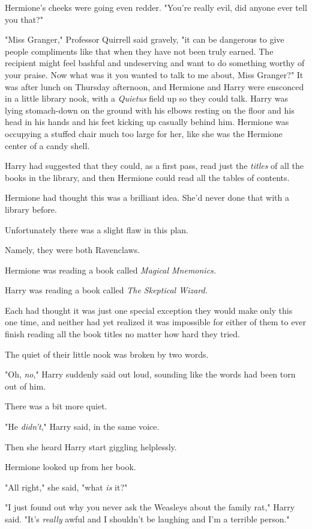 Hermione's cheeks were going even redder. "You're really evil, did anyone ever 
tell you that?"

"Miss Granger," Professor Quirrell said gravely, "it can be dangerous to give 
people compliments like that when they have not been truly earned. The 
recipient might feel bashful and undeserving and want to do something worthy of 
your praise. Now what was it you wanted to talk to me about, Miss Granger?"
\sbreak
It was after lunch on Thursday afternoon, and Hermione and Harry were ensconced 
in a little library nook, with a \emph{Quietus} field up so they could talk. 
Harry was lying stomach-down on the ground with his elbows resting on the floor 
and his head in his hands and his feet kicking up casually behind him. Hermione 
was occupying a stuffed chair much too large for her, like she was the Hermione 
center of a candy shell.

Harry had suggested that they could, as a first pass, read just the 
\emph{titles} of all the books in the library, and then Hermione could read all 
the tables of contents.

Hermione had thought this was a brilliant idea. She'd never done that with a 
library before.

Unfortunately there was a slight flaw in this plan.

Namely, they were both Ravenclaws.

Hermione was reading a book called \emph{Magical Mnemonics.}

Harry was reading a book called \emph{The Skeptical Wizard.}

Each had thought it was just one special exception they would make only this 
one time, and neither had yet realized it was impossible for either of them to 
ever finish reading all the book titles no matter how hard they tried.

The quiet of their little nook was broken by two words.

"Oh, \emph{no}," Harry suddenly said out loud, sounding like the words had been 
torn out of him.

There was a bit more quiet.

"He \emph{didn't}," Harry said, in the same voice.

Then she heard Harry start giggling helplessly.

Hermione looked up from her book.

"All right," she said, "what \emph{is} it?"

"I just found out why you never ask the Weasleys about the family rat," Harry 
said. "It's \emph{really} awful and I shouldn't be laughing and I'm a terrible 
person."

